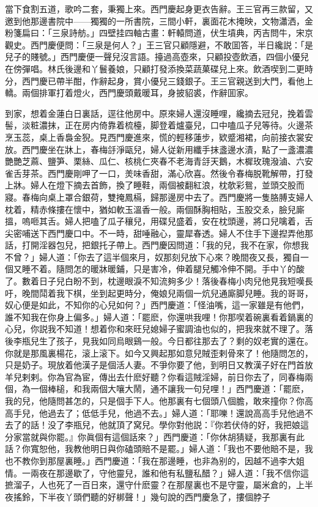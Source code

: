 當下食割五道，歌吟二套，秉獨上來。西門慶起身更衣告辭。王三官再三款留，又邀到他那邊書院中——獨獨的一所書院，三間小軒，裏面花木掩映，文物瀟洒，金粉箋扁曰：「三泉詩舫。」四壁挂四軸古畫：軒轅問道，伏生墳典，丙吉問牛，宋京觀史。西門慶便問：「三泉是何人？」王三官只顧隱避，不敢囬答，半日纔説：「是兒子的賤號。」西門慶便一聲兒沒言語。擡過高壺來，只顧投壺飲酒，四個小優兒在傍彈唱。林氏後邊和丫鬟養娘，只顧打發添換菜蔬菓碟兒上來。飲酒喫到二更時分，西門慶已帶半酣，作辭起身，賞小優兒三錢銀子。王三官親送到大門，看他上轎。兩個排軍打着燈火，西門慶頭戴暖耳，身披貂裘，作辭囬家。

到家，想着金蓮白日裏話，逕往他房中。原來婦人還沒睡哩，纔摘去冠兒，挽着雲髻，淡粧濃抹，正在房内倚靠着梳檯，脚登着爐臺兒，口中嗑瓜子兒等待。火邊茶烹玉蕊，桌上香裊金猊。見西門慶進來，慌的輕移蓮步，欵蹙湘裙，向前接衣裳安放。西門慶坐在牀上，春梅㧱淨甌兒，婦人従新用纖手抹盞邊水漬，點了一盞濃濃艷艷芝蔴、鹽笋、栗絲、瓜仁、核桃仁夾春不老海青㧱天鵝，木樨玫瑰潑滷、六安雀舌芽茶。西門慶剛呷了一口，羙味香甜，滿心欣喜。然後令春梅脱靴解帶，打發上牀。婦人在燈下摘去首飾，換了睡鞋，兩個被翻紅浪，枕欹彩鴛，並頭交股而寢。春梅向桌上罩合銀荷，雙掩鳳槅，歸那邊房中去了。西門慶將一隻胳膊支婦人枕着，精赤條摟在懷中，猶如軟玉溫香一般。兩個酥胸相貼，玉股交ゑ，臉兒廝搵，嗚咂其舌。婦人把嗑了瓜子穰兒，用碟兒盛着，安在枕頭邊，將口兒噙着，舌尖密哺送下西門慶口中。不一時，甜唾融心，靈犀春透。婦人不住手下邊揑弄他那話，打開淫器包兒，把銀托子帶上。西門慶因問道：「我的兒，我不在家，你想我不曾？」婦人道：「你去了這半個來月，奴那刻兒放下心來？晚間夜又長，獨自一個又睡不着。隨問怎的暖牀暖鋪，只是害冷，伸着腿兒觸冷伸不開。手中丫的酸了。數着日子兒白盼不到，枕邊眼淚不知流夠多少！落後春梅小肉兒他見我短嘆長吁，晚間鬦着我下棋，坐到起更時分，俺娘兒兩個一炕兒通廝脚兒睡。我的哥哥，奴心便是如此，不知你的心兒如何？」西門慶道：「怪油嘴，這一家雖是有他們，誰不知我在你身上偏多。」婦人道：「罷麽，你還哄我哩！你那喫着碗裏看着鍋裏的心兒，你説我不知道！想着你和來旺兒媳婦子蜜調油也似的，把我來就不理了。落後李瓶兒生了孩子，見我如同烏眼鷄一般。今日都往那去了？剩的奴老實的還在。你就是那風裏楊花，滚上滚下。如今又興起那如意兒賊歪剌骨來了！他隨問怎的，只是奶子。現放着他漢子是個活人妻。不爭你要了他，到明日又教漢子好在門首放羊兒剌剌。你為官為宦，傳出去什麽好聽？你看這賊淫婦，前日你去了，同春梅兩個，為一個棒槌，和我兩個大嚷大鬧，通不讓我一句兒哩！」西門慶道：「罷麽，我的兒，他隨問甚怎的，只是個手下人。他那裏有七個頭八個膽，敢來撞你？你高高手兒，他過去了；低低手兒，他過不去。」婦人道：「耶嚛！還說高高手兒他過不去了的話！没了李瓶兒，他就頂了窝兒。學你對他説：『你若伏侍的好，我把娘這分家當就與你罷。』你眞個有這個話來？」西門慶道：「你休胡猜疑，我那裏有此話？你寬恕他，我教他明日與你磕頭賠不是罷。」婦人道：「我也不要他賠不是，我也不教你到那屋裏睡。」西門慶道：「我在那邊睡，也非為别的，因越不過李大姐情。一兩夜在那邊歇了，守他靈兒，誰和他有私鹽私醋？」婦人道：「我不信你這摭溜子，人也死了一百日來，還守什麽靈？在那屋裏也不是守靈，屬米倉的，上半夜搖鈴，下半夜丫頭們聽的好梆聲！」幾句說的西門慶急了，摟個脖子